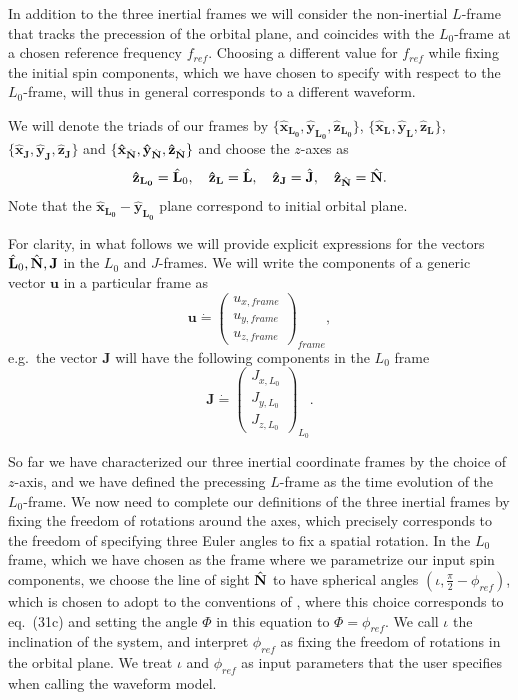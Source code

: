 \documentclass[%
aps,
prd,
amssymb,
amsmath,
amsfonts,
eqsecnum,
showpacs,
nofootinbib,
floatfix,
twocolumn,
twoside,
a4paper,
superscriptaddress
]{revtex4-1}
\newcommand{\x}{\mathbf{\hat{x}}}
\newcommand{\y}{\mathbf{\hat{y}}}
\newcommand{\z}{\mathbf{\hat{z}}}
\newcommand{\hN}{{\hat{\bf{N}}}}
\newcommand{\hJ}{{\hat{\bf{J}}}}
\newcommand{\hLO}{{\hat{\bf{L}}}_0}
\newcommand{\hL}{{\hat{\bf{L}}}}
\newcommand{\J}{\mathbf{J}}
\newcommand{\LO}{\mathbf{L_0}}
\newcommand{\BL}{\mathbf{L}}
\begin{document}
In addition to the three inertial frames we will consider the non-inertial $L$-frame that tracks the precession of the orbital plane, and coincides with the $L_0$-frame at a chosen reference frequency $f_{ref}$. Choosing a different value for $f_{ref}$ while fixing the initial spin components, which we have chosen to specify with respect to the $L_0$-frame, will thus in general corresponds to a different waveform.

We will denote the triads of our frames by $\{\x_{\LO}, \y_{\LO},\z_{\LO} \}$,
$\{\x_{\BL}, \y_{\BL},\z_{\BL} \}$,
$\{\x_{\J}, \y_{\J}, \z_{\J}\}$ and
$\{\x_{\hN}, \y_{\hN},\z_{\hN} \}$ and choose the $z$-axes as
\begin{equation}
\z_{\LO} = \hLO, \quad 
\z_{\BL} = \hL, \quad 
\z_{\J} = \hJ, \quad 
\z_{\hN} = \hN.
\end{equation}
Note that the $\x_{\LO}-\y_{\LO}$ plane correspond to initial orbital plane.


For clarity, in what follows we will provide explicit expressions for the vectors $\hLO, \hN, \J$ in the $L_0$ and $J$-frames. 
We will write the components of a generic vector $\mathbf{u}$ in a particular frame as 
\begin{equation}
    \mathbf{u} \dot= \begin{pmatrix}u_{x,frame}\\ u_{y,frame}\\ u_{z,frame} \end{pmatrix}_{frame},
\end{equation}
e.g.~the vector $\J$ will have the following components in the $L_0$ frame
\begin{equation}
    \J \dot= \begin{pmatrix} J_{x,L_0}\\ J_{y,L_0}\\ J_{z,L_0} \end{pmatrix}_{L_0}.
\end{equation}

So far we have characterized our three inertial coordinate frames by the choice of $z$-axis, and we have defined the precessing $L$-frame as the time evolution of the $L_0$-frame.
We now need to complete our definitions of the three inertial frames by fixing the freedom of rotations around the axes, which precisely corresponds to the freedom of specifying three Euler angles to fix a spatial rotation.
%
In the $L_0$ frame, which we have chosen as
the frame where we parametrize our input spin components, we choose  
the line of sight $\hN$  to have spherical angles $\left(\iota, \frac{\pi}{2} - \phi_{ref} \right)$, which  is chosen to adopt to the conventions of \cite{Schmidt:2010it},
where this choice corresponds to eq.~(31c) 
and setting the angle $\Phi$ in this equation to $\Phi = \phi_{ref}$.
%
We call $\iota$ the inclination of the system, and interpret $\phi_{ref}$
as fixing the freedom of rotations in the orbital plane.
We treat $\iota$ and $\phi_{ref}$ as input parameters that the user specifies when calling the waveform model.
\end{document}
